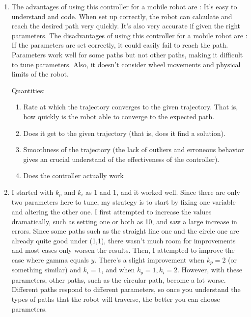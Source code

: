 \documentclass{article}
\begin{document}
\begin{enumerate}
    \item The advantages of using this controller for a mobile robot are : It's easy to understand and code. When set up correctly, the robot can calculate and reach the desired path very quickly. It's also very accurate if given the right parameters.
    The disadvantages of using this controller for a mobile robot are : If the parameters are set correctly, it could easily fail to reach the path. Parameters work well for some paths but not other paths, making it difficult to tune parameters.  Also, it doesn't consider wheel movements and physical limits of the robot.
    
    
    Quantities: 
        \begin{enumerate}
        \item Rate at which the trajectory converges to the given trajectory. That is, how quickly is the robot able to converge to the expected path.
        \item  Does it get to the given trajectory (that is, does it find a solution). 
        \item  Smoothness of the trajectory (the lack of outliers and erroneous behavior gives an crucial understand of the effectiveness of the controller). 
        \item  Does the controller actually work
        
        \end{enumerate}
        
    
    \item I started with $k_p$ and $k_i$ as 1 and 1, and it worked well. Since there are only two parameters here to tune, my strategy is to start by fixing one variable and altering the other one. I first attempted to increase the values dramatically, such as setting one or both as 10, and saw a large increase in errors. Since some paths such as the straight line one and the circle one are already quite good under (1,1), there wasn't much room for improvements and most cases only worsen the results. Then, I attempted to improve the case where gamma equals $y$. There's a slight improvement when $k_p = 2$ (or something similar) and $k_i = 1$, and when $k_p = 1, k_i = 2$. However, with these parameters, other paths, such as the circular path, become a lot worse. Different paths respond to different parameters, so once you understand the types of paths that the robot will traverse, the better you can choose parameters.
    

\end{enumerate}
\end{document}
